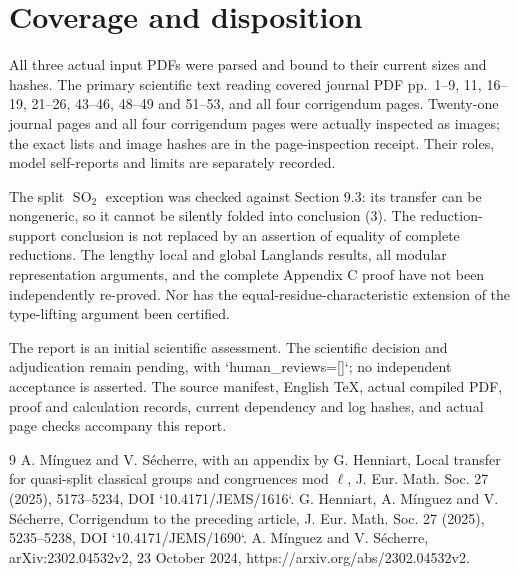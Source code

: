 \documentclass[10pt]{article}
\begin{document}
\section*{Coverage and disposition}
All three actual input PDFs were parsed and bound to their current sizes and hashes. The primary scientific text reading covered journal PDF pp. 1–9, 11, 16–19, 21–26, 43–46, 48–49 and 51–53, and all four corrigendum pages. Twenty-one journal pages and all four corrigendum pages were actually inspected as images; the exact lists and image hashes are in the page-inspection receipt. Their roles, model self-reports and limits are separately recorded.\par
The split \(\operatorname{SO}_2\) exception was checked against Section 9.3: its transfer can be nongeneric, so it cannot be silently folded into conclusion (3). The reduction-support conclusion is not replaced by an assertion of equality of complete reductions. The lengthy local and global Langlands results, all modular representation arguments, and the complete Appendix C proof have not been independently re-proved. Nor has the equal-residue-characteristic extension of the type-lifting argument been certified.\par
The report is an initial scientific assessment. The scientific decision and adjudication remain pending, with `human\_reviews=[]`; no independent acceptance is asserted. The source manifest, English TeX, actual compiled PDF, proof and calculation records, current dependency and log hashes, and actual page checks accompany this report.\par
9 A. Mínguez and V. Sécherre, with an appendix by G. Henniart, Local transfer for quasi-split classical groups and congruences mod \(\ell\), J. Eur. Math. Soc. 27 (2025), 5173–5234, DOI `10.4171/JEMS/1616`. G. Henniart, A. Mínguez and V. Sécherre, Corrigendum to the preceding article, J. Eur. Math. Soc. 27 (2025), 5235–5238, DOI `10.4171/JEMS/1690`. A. Mínguez and V. Sécherre, arXiv:2302.04532v2, 23 October 2024, https://arxiv.org/abs/2302.04532v2.\par
\end{document}
